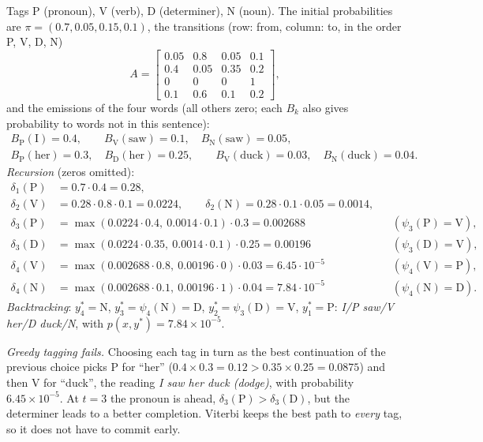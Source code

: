 \begin{notechapter}
\begin{example}\label{hmm-viterbi:ex:duck}
Tags P (pronoun), V (verb), D (determiner), N (noun). The initial probabilities are $\pi = (0.7, 0.05, 0.15, 0.1)$, the
transitions (row: from, column: to, in the order P, V, D, N)
\[
  A = \begin{bmatrix}0.05 & 0.8 & 0.05 & 0.1\\ 0.4 & 0.05 & 0.35 & 0.2\\ 0 & 0 & 0 & 1\\ 0.1 & 0.6 & 0.1 & 0.2\end{bmatrix},
\]
and the emissions of the four words (all others zero; each $B_k$ also gives probability to words
not in this sentence):
\begin{gather*}
  B_{\mathrm P}(\text{I}) = 0.4,\qquad B_{\mathrm V}(\text{saw}) = 0.1,\quad B_{\mathrm N}(\text{saw}) = 0.05,\\
  B_{\mathrm P}(\text{her}) = 0.3,\quad B_{\mathrm D}(\text{her}) = 0.25,\qquad B_{\mathrm V}(\text{duck}) = 0.03,\quad B_{\mathrm N}(\text{duck}) = 0.04 .
\end{gather*}
\emph{Recursion} (zeros omitted):
\begin{align*}
  \delta_1(\mathrm P) &= 0.7\cdot0.4 = 0.28,\\
  \delta_2(\mathrm V) &= 0.28\cdot0.8\cdot0.1 = 0.0224,\qquad \delta_2(\mathrm N) = 0.28\cdot0.1\cdot0.05 = 0.0014,\\
  \delta_3(\mathrm P) &= \max(0.0224\cdot0.4,\ 0.0014\cdot0.1)\cdot0.3 = 0.002688 &&(\psi_3(\mathrm P) = \mathrm V),\\
  \delta_3(\mathrm D) &= \max(0.0224\cdot0.35,\ 0.0014\cdot0.1)\cdot0.25 = 0.00196 &&(\psi_3(\mathrm D) = \mathrm V),\\
  \delta_4(\mathrm V) &= \max(0.002688\cdot0.8,\ 0.00196\cdot0)\cdot0.03 = 6.45\cdot10^{-5} &&(\psi_4(\mathrm V) = \mathrm P),\\
  \delta_4(\mathrm N) &= \max(0.002688\cdot0.1,\ 0.00196\cdot1)\cdot0.04 = 7.84\cdot10^{-5} &&(\psi_4(\mathrm N) = \mathrm D).
\end{align*}
\emph{Backtracking}: $y_4^* = \mathrm N$, $y_3^* = \psi_4(\mathrm N) = \mathrm D$, $y_2^* = \psi_3(\mathrm D) = \mathrm V$, $y_1^* = \mathrm P$: \emph{I/P saw/V her/D duck/N}, with
$p(x, y^*) = 7.84\times10^{-5}$.

\emph{Greedy tagging fails.} Choosing each tag in turn as the best continuation of the previous
choice picks P for ``her'' ($0.4\times0.3 = 0.12 > 0.35\times0.25 = 0.0875$) and then V for ``duck'', the reading \emph{I saw her
duck (dodge)}, with probability $6.45\times10^{-5}$. At $t = 3$ the pronoun is ahead, $\delta_3(\mathrm P) > \delta_3(\mathrm D)$, but the determiner
leads to a better completion. Viterbi keeps the best path to \emph{every} tag, so it does not have to
commit early.
\end{example}


\end{notechapter}
